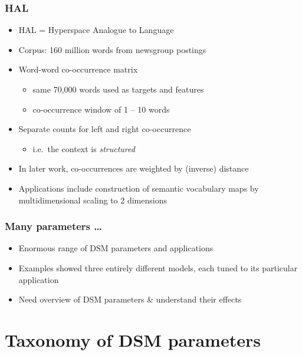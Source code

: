 \begin{frame}
  \frametitle{HAL \citep{Lund:Burgess:96}}

  \begin{itemize}
  \item HAL = Hyperspace Analogue to Language
  \item Corpus: 160 million words from newsgroup postings
  \item Word-word co-occurrence matrix
    \begin{itemize}
    \item same 70,000 words used as targets and features
    \item co-occurrence window of 1 -- 10 words
    \end{itemize}
  \item Separate counts for left and right co-occurrence
    \begin{itemize}
    \item i.e.\ the context is \emph{structured}
    \end{itemize}
  \item In later work, co-occurrences are weighted by (inverse) distance \citep{Li:Burgess:Lund:00}
  \item Applications include construction of semantic vocabulary maps
    by multidimensional scaling to 2 dimensions
  \end{itemize}
\end{frame}

\begin{frame}
  \frametitle{Many parameters \ldots}

  \begin{itemize}
  \item Enormous range of DSM parameters and applications
  \item Examples showed three entirely different models, each tuned to
    its particular application
  \item[\So] Need overview of DSM parameters \& understand their effects
  \end{itemize}
\end{frame}

\section{Taxonomy of DSM parameters}

